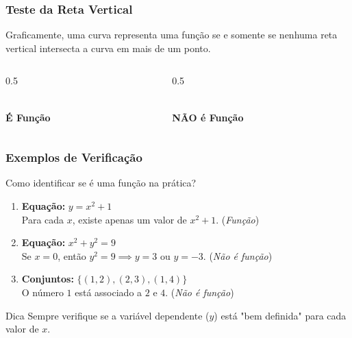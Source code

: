\documentclass[9pt]{beamer}
\begin{document}
\begin{frame}
\frametitle{Teste da Reta Vertical}
Graficamente, uma curva representa uma função se e somente se nenhuma reta vertical intersecta a curva em mais de um ponto.

\begin{columns}
\begin{column}{0.5\textwidth}
\centering
{}
\\ \textbf{É Função}
\end{column}

\begin{column}{0.5\textwidth}
\centering
{}
\\ \textbf{NÃO é Função}
\end{column}
\end{columns}
\end{frame}

\begin{frame}
\frametitle{Exemplos de Verificação}
Como identificar se é uma função na prática?

\begin{enumerate}
    \item \textbf{Equação:} $y = x^2 + 1$ \\
    Para cada $x$, existe apenas um valor de $x^2 + 1$. (\textit{Função})
    
    \item \textbf{Equação:} $x^2 + y^2 = 9$ \\
    Se $x=0$, então $y^2=9 \implies y=3$ ou $y=-3$. (\textit{Não é função})
    
    \item \textbf{Conjuntos:} $\{(1,2), (2,3), (1,4)\}$ \\
    O número $1$ está associado a $2$ e $4$. (\textit{Não é função})
\end{enumerate}

\begin{block}{Dica}
Sempre verifique se a variável dependente ($y$) está "bem definida" para cada valor de $x$.
\end{block}
\end{frame}
\end{document}
